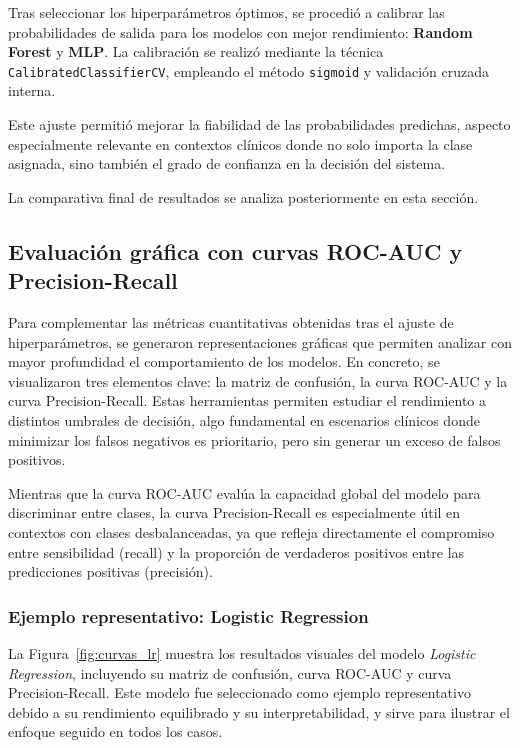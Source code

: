 Tras seleccionar los hiperparámetros óptimos, se procedió a calibrar las probabilidades de salida para los modelos con mejor rendimiento: \textbf{Random Forest} y \textbf{MLP}. La calibración se realizó mediante la técnica \texttt{CalibratedClassifierCV}, empleando el método \texttt{sigmoid} y validación cruzada interna.

Este ajuste permitió mejorar la fiabilidad de las probabilidades predichas, aspecto especialmente relevante en contextos clínicos donde no solo importa la clase asignada, sino también el grado de confianza en la decisión del sistema.

La comparativa final de resultados se analiza posteriormente en esta sección.


\subsection{Evaluación gráfica con curvas ROC-AUC y Precision-Recall}

Para complementar las métricas cuantitativas obtenidas tras el ajuste de hiperparámetros, se generaron representaciones gráficas que permiten analizar con mayor profundidad el comportamiento de los modelos. En concreto, se visualizaron tres elementos clave: la matriz de confusión, la curva ROC-AUC y la curva Precision-Recall. Estas herramientas permiten estudiar el rendimiento a distintos umbrales de decisión, algo fundamental en escenarios clínicos donde minimizar los falsos negativos es prioritario, pero sin generar un exceso de falsos positivos.

Mientras que la curva ROC-AUC evalúa la capacidad global del modelo para discriminar entre clases, la curva Precision-Recall es especialmente útil en contextos con clases desbalanceadas, ya que refleja directamente el compromiso entre sensibilidad (recall) y la proporción de verdaderos positivos entre las predicciones positivas (precisión).

\subsubsection{Ejemplo representativo: Logistic Regression}

La Figura~\ref{fig:curvas_lr} muestra los resultados visuales del modelo \textit{Logistic Regression}, incluyendo su matriz de confusión, curva ROC-AUC y curva Precision-Recall. Este modelo fue seleccionado como ejemplo representativo debido a su rendimiento equilibrado y su interpretabilidad, y sirve para ilustrar el enfoque seguido en todos los casos.


